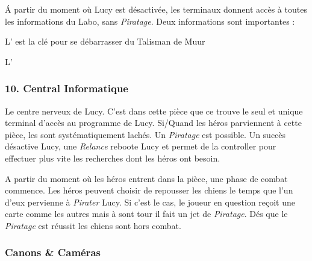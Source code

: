 \'A partir du moment où Lucy est désactivée, les terminaux donnent accès à toutes les informations du Labo, sans \textit{Piratage}. Deux informations sont importantes :
\begin{rebelist}
    \item L’ est la clé pour se débarrasser du Talisman de Muur
    \item L’
\end{rebelist}

\subsubsection{10. Central Informatique}
Le centre nerveux de Lucy. C’est dans cette pièce que ce trouve le seul et unique terminal d’accès au programme de Lucy. Si/Quand les héros parviennent à cette pièce, les  sont systématiquement lachés. Un \textit{Piratage} est possible. Un succès désactive Lucy, une \textit{Relance} reboote Lucy et permet de la controller pour effectuer plus vite les recherches dont les héros ont besoin.

A partir du moment où les héros entrent dans la pièce, une phase de combat commence. Les héros peuvent choisir de repousser les chiens le temps que l’un d’eux pervienne à \textit{Pirater} Lucy. Si c’est le cas, le joueur en question reçoit une carte comme les autres mais à sont tour il fait un jet de \textit{Piratage}. Dés que le \textit{Piratage} est réussit les chiens sont hors combat.

\subsubsection{Canons \& Caméras}

\onecolumn

